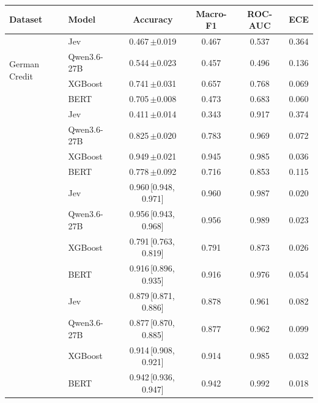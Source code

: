 \begin{tabular}{llcccc}
\toprule
Dataset & Model & Accuracy & Macro-F1 & ROC-AUC & ECE \\
\midrule
\multirow{4}{*}{German Credit} & Jev & 0.467\,{\scriptsize$\pm$0.019} & 0.467 & 0.537 & 0.364 \\
 & Qwen3.6-27B & 0.544\,{\scriptsize$\pm$0.023} & 0.457 & 0.496 & 0.136 \\
 & XGBoost & 0.741\,{\scriptsize$\pm$0.031} & 0.657 & 0.768 & 0.069 \\
 & BERT & 0.705\,{\scriptsize$\pm$0.008} & 0.473 & 0.683 & 0.060 \\
\addlinespace
\multirow{4}{*}{Breast Cancer Wisconsin} & Jev & 0.411\,{\scriptsize$\pm$0.014} & 0.343 & 0.917 & 0.374 \\
 & Qwen3.6-27B & 0.825\,{\scriptsize$\pm$0.020} & 0.783 & 0.969 & 0.072 \\
 & XGBoost & 0.949\,{\scriptsize$\pm$0.021} & 0.945 & 0.985 & 0.036 \\
 & BERT & 0.778\,{\scriptsize$\pm$0.092} & 0.716 & 0.853 & 0.115 \\
\addlinespace
\multirow{4}{*}{SST-2} & Jev & 0.960\,{\scriptsize[0.948,\,0.971]} & 0.960 & 0.987 & 0.020 \\
 & Qwen3.6-27B & 0.956\,{\scriptsize[0.943,\,0.968]} & 0.956 & 0.989 & 0.023 \\
 & XGBoost & 0.791\,{\scriptsize[0.763,\,0.819]} & 0.791 & 0.873 & 0.026 \\
 & BERT & 0.916\,{\scriptsize[0.896,\,0.935]} & 0.916 & 0.976 & 0.054 \\
\addlinespace
\multirow{4}{*}{AG News} & Jev & 0.879\,{\scriptsize[0.871,\,0.886]} & 0.878 & 0.961 & 0.082 \\
 & Qwen3.6-27B & 0.877\,{\scriptsize[0.870,\,0.885]} & 0.877 & 0.962 & 0.099 \\
 & XGBoost & 0.914\,{\scriptsize[0.908,\,0.921]} & 0.914 & 0.985 & 0.032 \\
 & BERT & 0.942\,{\scriptsize[0.936,\,0.947]} & 0.942 & 0.992 & 0.018 \\
\bottomrule
\end{tabular}
